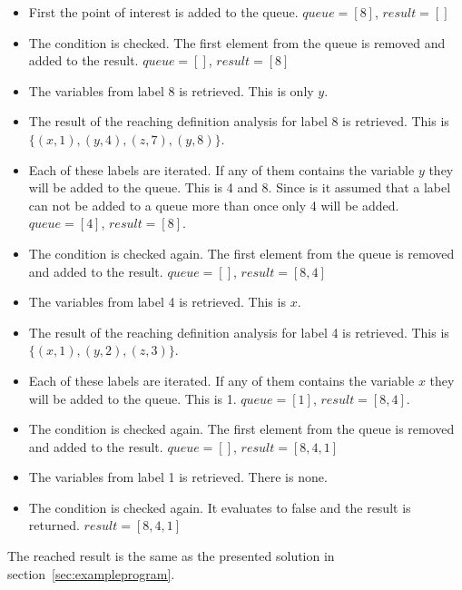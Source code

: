 \begin{itemize}
	\item First the point of interest is added to the queue. $queue=[8]$, $result=[]$
	\item The condition is checked. The first element from the queue is removed and added to the result. $queue=[]$, $result=[8]$
	\item The variables from label 8 is retrieved. This is only $y$.
	\item The result of the reaching definition analysis for label 8 is retrieved. This is $\{(x, 1), (y, 4), (z, 7), (y, 8)\}$.
	\item Each of these labels are iterated. If any of them contains the variable $y$ they will be added to the queue. This is 4 and 8. Since is it assumed that a label can not be added to a queue more than once only 4 will be added. $queue=[4]$, $result=[8]$.
	\item The condition is checked again. The first element from the queue is removed and added to the result. $queue=[]$, $result=[8,4]$
	\item The variables from label 4 is retrieved. This is $x$.
	\item The result of the reaching definition analysis for label 4 is retrieved. This is $\{(x, 1), (y, 2), (z, 3)\}$.
	\item Each of these labels are iterated. If any of them contains the variable $x$ they will be added to the queue. This is 1. $queue=[1]$, $result=[8,4]$.
	\item The condition is checked again. The first element from the queue is removed and added to the result. $queue=[]$, $result=[8,4,1]$
	\item The variables from label 1 is retrieved. There is none.
	\item The condition is checked again. It evaluates to false and the result is returned. $result=[8,4,1]$
\end{itemize}
The reached result is the same as the presented solution in section~\ref{sec:exampleprogram}.